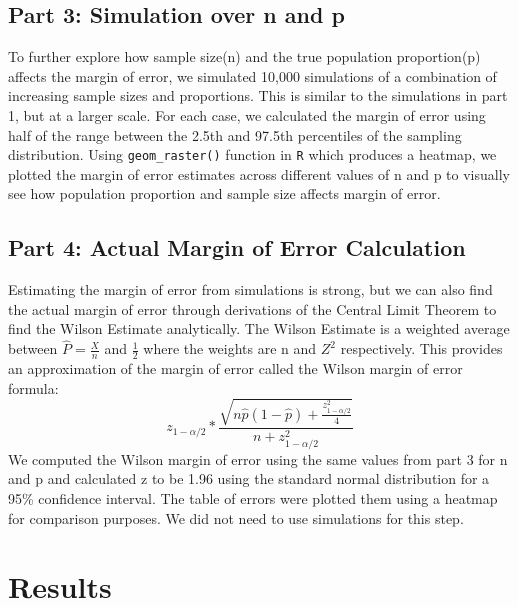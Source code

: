 \documentclass{article}\usepackage[]{graphicx}\usepackage[]{xcolor}
\begin{document}
\begin{multicols}{2}
\subsection{Part 3: Simulation over n and p}

To further explore how sample size(n) and the true population proportion(p) affects the margin of error, we simulated 10,000 simulations of a combination of increasing sample sizes and proportions. This is similar to the simulations in part 1, but at a larger scale. For each case, we calculated the margin of error using half of the range between the 2.5th and 97.5th percentiles of the sampling distribution. Using \texttt{geom\_raster()} function in \texttt{R} which produces a heatmap, we plotted the margin of error estimates across different values of n and p to visually see how population proportion and sample size affects margin of error.

\subsection{Part 4: Actual Margin of Error Calculation}

Estimating the margin of error from simulations is strong, but we can also find the actual margin of error through derivations of the Central Limit Theorem to find the Wilson Estimate analytically. The Wilson Estimate is a weighted average between \(\hat{P} = \frac{X}{n}\) and \(\frac{1}{2}\) where the weights are n and \(Z^2\) respectively. This provides an approximation of the margin of error called the Wilson margin of error formula:
$$
z_{1 - \alpha/2} * \frac{ \sqrt{n \hat{p} (1 - \hat{p}) + \frac{z_{1 - \alpha/2}^2}{4}} }{n + z_{1 - \alpha/2}^2}
$$
We computed the Wilson margin of error using the same values from part 3 for n and p and calculated z to be 1.96 using the standard normal distribution for a 95\% confidence interval. The table of errors were plotted them using a heatmap for comparison purposes. We did not need to use simulations for this step.



\section{Results}

\end{multicols}
\end{document}
